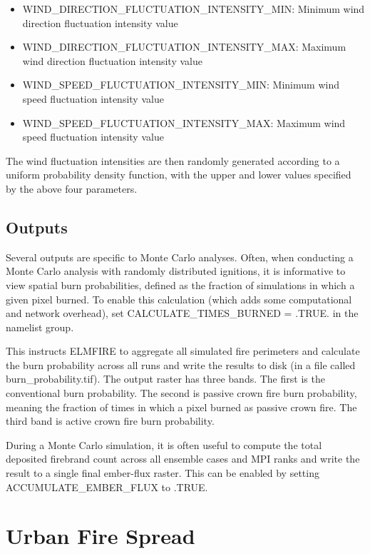 \begin{itemize}
    \item WIND\_DIRECTION\_FLUCTUATION\_INTENSITY\_MIN: Minimum wind direction fluctuation intensity value
    \item WIND\_DIRECTION\_FLUCTUATION\_INTENSITY\_MAX: Maximum wind direction fluctuation intensity value
    \item WIND\_SPEED\_FLUCTUATION\_INTENSITY\_MIN: Minimum wind speed fluctuation intensity value
    \item WIND\_SPEED\_FLUCTUATION\_INTENSITY\_MAX: Maximum wind speed fluctuation intensity value
\end{itemize}

The wind fluctuation intensities are then randomly generated according to a uniform probability density function, with the upper and lower values specified by the above four parameters.

\subsection{Outputs}
\label{monte_carlo_outputs}

Several outputs are specific to Monte Carlo analyses. Often, when conducting a Monte Carlo analysis with randomly distributed ignitions, it is informative to view spatial burn probabilities, defined as the fraction of simulations in which a given pixel burned. To enable this calculation (which adds some computational and network overhead), set CALCULATE\_TIMES\_BURNED = .TRUE. in the  namelist group. 

This instructs ELMFIRE to aggregate all simulated fire perimeters and calculate the burn probability across all runs and write the results to disk (in a file called burn\_probability.tif). The output raster has three bands. The first is the conventional burn probability. The second is passive crown fire burn probability, meaning the fraction of times in which a pixel burned as passive crown fire. The third band is active crown fire burn probability.

During a Monte Carlo simulation, it is often useful to compute the total deposited firebrand count across all ensemble cases and MPI ranks and write the result to a single final ember-flux raster. This can be enabled by setting ACCUMULATE\_EMBER\_FLUX to .TRUE.

\section{Urban Fire Spread}
\label{building_spread}


